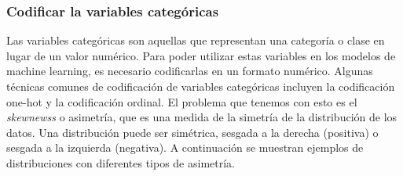 \subsubsection{Codificar la variables categóricas}
Las variables categóricas son aquellas que representan una categoría o clase en lugar de un valor numérico. Para poder utilizar estas variables en los modelos de machine learning, es necesario codificarlas en un formato numérico. Algunas técnicas comunes de codificación de variables categóricas incluyen la codificación one-hot y la codificación ordinal.
El problema que tenemos con esto es el \textit{skewnewss} o asimetría, que es una medida de la simetría de la distribución de los datos. Una distribución puede ser simétrica, sesgada a la derecha (positiva) o sesgada a la izquierda (negativa). A continuación se muestran ejemplos de distribuciones con diferentes tipos de asimetría.


